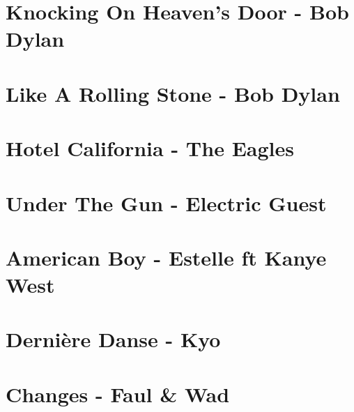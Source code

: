 \documentclass[11pt]{article}
\begin{document}
\section{Knocking On Heaven's Door - Bob Dylan}
\begin{guitar}

\end{guitar}

\section*{Like A Rolling Stone - Bob Dylan}
\begin{guitar}

\end{guitar}



\section{Hotel California - The Eagles}
\begin{guitar}

\end{guitar}

\section{Under The Gun - Electric Guest}
\begin{guitar}

\end{guitar}


\section{American Boy - Estelle ft Kanye West}


\section{Dernière Danse - Kyo}
\begin{guitar}

\end{guitar}


\section{Changes - Faul \& Wad}
\begin{guitar}

\end{guitar}
\end{document}

